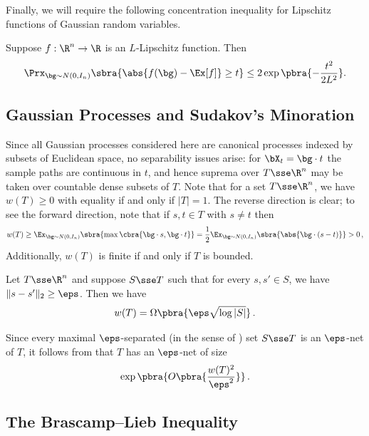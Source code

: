 \documentclass[11pt]{article}
\begin{document}
Finally, we will require the following concentration inequality for Lipschitz functions of Gaussian random variables.

\begin{proposition}
\label{prop:lipschitz-concentration}
	Suppose $f:\R^n\to\R$ is an $L$-Lipschitz function. Then 
	\[
		\Prx_{\bg\sim N(0,I_n)}\sbra{\abs{f(\bg) - \Ex[f]} \geq t} \leq 2\exp\pbra{-\frac{t^2}{2L^2}}.
	\]
\end{proposition}

\subsection{Gaussian Processes and Sudakov's Minoration}
\label{subsec:prelims-GP} 

Since all Gaussian processes considered here are canonical processes indexed by subsets of Euclidean space, no separability issues arise: for $\bX_t=\bg\cdot t$ the sample paths are continuous in $t$, and hence suprema over $T\sse\R^n$ may be taken over countable dense subsets of $T$. 
Note that for a set $T \sse \R^n$, we have $w(T) \geq 0$ with  equality if and only if $|T| = 1$. 
The reverse direction is clear; to see the forward direction, note that if $s, t \in T$ with $s \neq t$ then 
\[
	w(T) \geq \Ex_{\bg\sim N(0, I_n)}\sbra{\max\cbra{\bg\cdot s, \bg\cdot t}} = \frac{1}{2}\Ex_{\bg\sim N(0, I_n)}\sbra{\abs{\bg\cdot (s-t)}} > 0\,,
\]
Additionally, $w(T)$ is finite if and only if $T$ is bounded. 

\begin{lemma} 
\label{lem:sudakov}
	Let $T \sse \R^n$ and suppose $S \sse T$ such that for every $s, s' \in S$, we have $\|s-s'\|_2 \geq \eps$.	
	Then we have 
	\[
		w(T) = \Omega\pbra{\eps \sqrt{\log |S|}}\,. 
	\]
\end{lemma}

Since every maximal $\eps$-separated (in the sense of ) set $S \sse T$ is an $\eps$-net of $T$, it follows from  that $T$ has an $\eps$-net of size 
\begin{equation} \label{eq:sudakov-net-size}
	\exp\pbra{O\pbra{\frac{w(T)^2}{\eps^2}}}\,.
\end{equation}

\subsection{The Brascamp--Lieb Inequality}
\label{subsec:BL}
\end{document}
